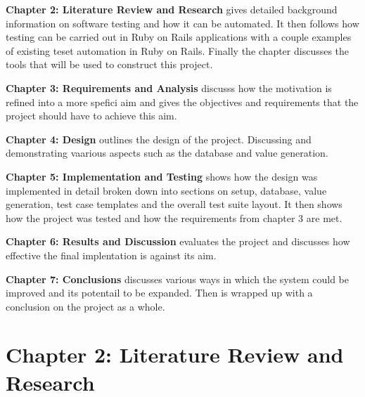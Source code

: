 \documentclass[a4paper,12pt]{article}
\begin{document}
\par \textbf{Chapter 2: Literature Review and Research} gives detailed background information on software testing and how it can be automated. It then follows how testing can be carried out in Ruby on Rails applications with a couple examples of existing teset automation in Ruby on Rails. Finally the chapter discusses the tools that will be used to construct this project.
\par \textbf{Chapter 3: Requirements and Analysis} discusss how the motivation is refined into a more spefici aim and gives the objectives and requirements that the project should have to achieve this aim.
\par \textbf{Chapter 4: Design} outlines the design of the project. Discussing and demonstrating vaarious aspects such as the database and value generation.
\par \textbf{Chapter 5: Implementation and Testing} shows how the design was implemented in detail broken down into sections on setup, database, value generation, test case templates and the overall test suite layout. It then shows how the project was tested and how the requirements from chapter 3 are met.
\par \textbf{Chapter 6: Results and Discussion} evaluates the project and discusses how effective the final implentation is against its aim.
\par \textbf{Chapter 7: Conclusions} discusses various ways in which the system could be improved and its potentail to be expanded. Then is wrapped up with a conclusion on the project as a whole.





\newpage
\section{Chapter 2: Literature Review and Research}
\end{document}
